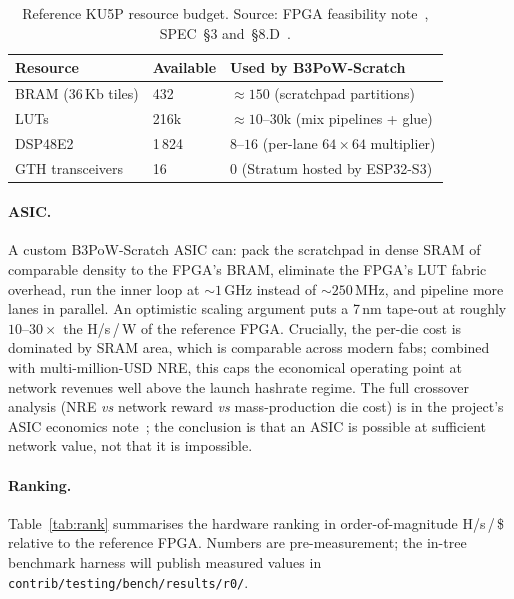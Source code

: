\documentclass[11pt,a4paper]{article}
\theoremstyle{plain}
\theoremstyle{definition}
\theoremstyle{remark}
\begin{document}
\begin{table}[t]
\centering
\caption{Reference KU5P resource budget. Source:
         FPGA feasibility note~\cite{b3chain-fpga}, SPEC~\S3
         and~\S8.D~\cite{b3chain-spec}.}
\label{tab:fpga}
\begin{tabular}{lll}
\toprule
Resource          & Available & Used by B3PoW-Scratch \\
\midrule
BRAM (36\,Kb tiles) & 432    & $\approx 150$ (scratchpad partitions) \\
LUTs                & 216k   & $\approx 10$--$30$k (mix pipelines + glue) \\
DSP48E2             & 1\,824 & $8$--$16$ (per-lane $64\times 64$ multiplier) \\
GTH transceivers    & 16     & 0 (Stratum hosted by ESP32-S3) \\
\bottomrule
\end{tabular}
\end{table}

\paragraph{ASIC.}
A custom B3PoW-Scratch ASIC can: pack the scratchpad in dense SRAM
of comparable density to the FPGA's BRAM, eliminate the FPGA's LUT
fabric overhead, run the inner loop at $\sim 1$\,GHz instead of
$\sim 250$\,MHz, and pipeline more lanes in parallel. An optimistic
scaling argument puts a 7\,nm tape-out at roughly $10$--$30\times$
the H/s\,/\,W of the reference FPGA. Crucially, the per-die cost is
dominated by SRAM area, which is comparable across modern fabs;
combined with multi-million-USD NRE, this caps the economical
operating point at network revenues well above the launch hashrate
regime. The full crossover analysis (NRE \emph{vs} network reward
\emph{vs} mass-production die cost) is in the project's ASIC
economics note~\cite{b3chain-asic}; the conclusion is that an ASIC
is possible at sufficient network value, not that it is impossible.

\paragraph{Ranking.}
Table~\ref{tab:rank} summarises the hardware ranking in
order-of-magnitude H/s\,/\,\$ relative to the reference FPGA.
Numbers are pre-measurement; the in-tree benchmark harness will
publish measured values in
\texttt{contrib/testing/bench/results/r0/}.
\end{document}
